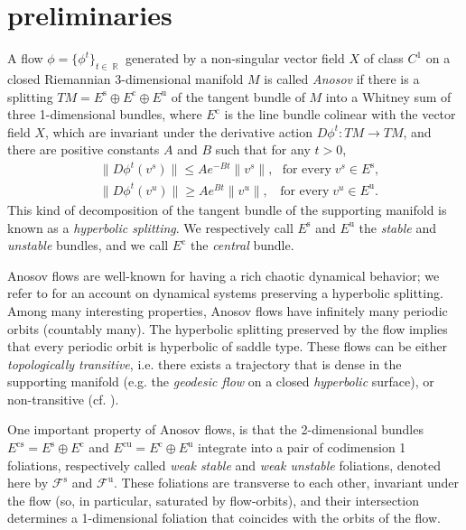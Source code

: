 \documentclass[12pt]{amsart}
\theoremstyle{definition}
\theoremstyle{remark}
\DeclareMathOperator{\R}{\mathbb{R}}
\newcommand{\Es}{E^{\mathrm{s}}}
\newcommand{\Eu}{E^{\mathrm{u}}}
\newcommand{\Ec}{E^{\mathrm{c}}}
\newcommand{\Ecs}{E^{\mathrm{cs}}}
\newcommand{\Ecu}{E^{\mathrm{cu}}}
\newcommand{\Fcs}{\mathcal{F}^{\mathrm{s}}}
\newcommand{\Fcu}{\mathcal{F}^{\mathrm{u}}}
\begin{document}

\section{preliminaries}
\label{sec_preliminaries}

A flow $\phi=\{\phi^t\}_{t\in\R}$ generated by a non-singular vector field $X$ of class $C^1$ on a closed Riemannian 3-dimensional manifold $M$ is called {\it Anosov} if there is a splitting 
$TM=\Es \oplus \Ec \oplus \Eu$
of the tangent bundle of $M$ into a Whitney sum of three 1-dimensional bundles, where $\Ec$ is the line bundle colinear with the vector field $X$, which are invariant under the derivative action $D\phi^t:TM\to TM$, and there are positive constants $A$ and $B$ such that for any $t>0$,
\begin{align*}
    & \lVert D \phi^t(v^s) \rVert\leq Ae^{-Bt} \lVert  v^s\rVert,\ \ \ \text{for every}\;v^s \in \Es,\\
    & \lVert D \phi^t(v^u) \rVert\geq Ae^{Bt} \lVert  v^u\rVert,\ \ \ \ \text{for every}\;v^u \in \Eu.
\end{align*}
This kind of decomposition of the tangent bundle of the supporting manifold is known as a \emph{hyperbolic splitting}. We respectively call $\Es$ and $\Eu$ the \emph{stable} and \emph{unstable} bundles, and we call $\Ec$ the \emph{central} bundle. 


Anosov flows are well-known for having a rich chaotic dynamical behavior; we refer to \cite{Katok-Hasselblatt} for an account on dynamical systems preserving a hyperbolic splitting. Among many interesting properties, Anosov flows have infinitely many periodic orbits (countably many). The hyperbolic splitting preserved by the flow implies that every periodic orbit is hyperbolic of saddle type. These flows can be either \emph{topologically transitive}, i.e. there exists a trajectory that is dense in the supporting manifold (e.g. the \emph{geodesic flow} on a closed \emph{hyperbolic} surface), or non-transitive (cf. \cite{FranksWilliams1989}).  


One important property of Anosov flows, is that the 2-dimensional bundles $\Ecs=\Es\oplus\Ec$ and $\Ecu=\Ec\oplus\Eu$ integrate into a pair of codimension 1 foliations, respectively called \emph{weak stable} and \emph{weak unstable} foliations, denoted here by $\Fcs$ and $\Fcu$. These foliations are transverse to each other, invariant under the flow (so, in particular, saturated by flow-orbits), and their intersection determines a 1-dimensional foliation that coincides with the orbits of the flow. 
\end{document}
